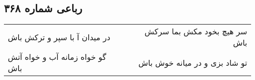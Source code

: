 \begin{center}
\section*{رباعی شماره ۳۶۸}
\label{sec:sh368}
\begin{longtable}{l p{0.5cm} r}
در میدان آ با سپر و ترکش باش
&&
سر هیچ بخود مکش بما سرکش باش
\\
گو خواه زمانه آب و خواه آتش باش
&&
تو شاد بزی و در میانه خوش باش
\\
\end{longtable}
\end{center}
